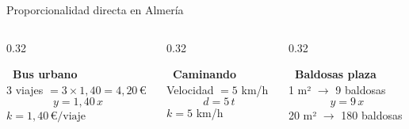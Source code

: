 \documentclass[aspectratio=169, 10pt, spanish]{beamer}
\begin{document}
\begin{frame}{Proporcionalidad directa en Almería}
  \begin{columns}[t]
    \begin{column}{0.32\textwidth}
      \begin{ejemplobox}
        \textbf{\faMapMarkerAlt\ Bus urbano}\\[4pt]
        3 viajes $= 3 \times 1{,}40 = 4{,}20\,\text{€}$\\[4pt]
        \[y = 1{,}40\,x\]
        $k = 1{,}40\,\text{€}/\text{viaje}$
      \end{ejemplobox}
    \end{column}
    \begin{column}{0.32\textwidth}
      \begin{ejemplobox}
        \textbf{\faWalking\ Caminando}\\[4pt]
        Velocidad $= 5$ km/h\\[4pt]
        \[d = 5\,t\]
        $k = 5$ km/h
      \end{ejemplobox}
    \end{column}
    \begin{column}{0.32\textwidth}
      \begin{ejemplobox}
        \textbf{\faPaintRoller\ Baldosas plaza}\\[4pt]
        1 m² $\to$ 9 baldosas\\[4pt]
        \[y = 9\,x\]
        20 m² $\to$ 180 baldosas
      \end{ejemplobox}
    \end{column}
  \end{columns}
  \vspace{0.4cm}
  \begin{center}
  \end{center}
\end{frame}
\end{document}

